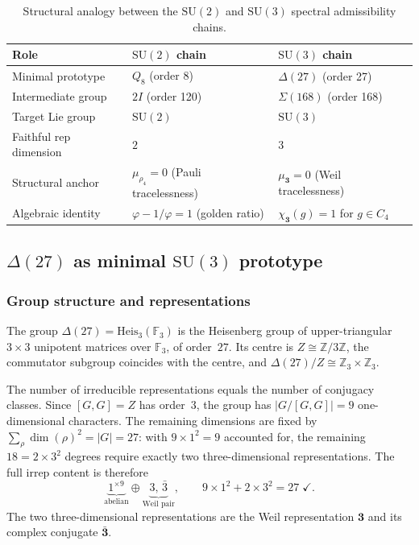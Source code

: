 \documentclass[11pt,a4paper]{article}
\begin{document}
    \begin{table}[h]
      \centering
      \renewcommand{\arraystretch}{1.3}
      \begin{tabular}{lll}
        \hline
        Role & $\mathrm{SU}(2)$ chain & $\mathrm{SU}(3)$ chain \\
        \hline
        Minimal prototype & $Q_8$ (order 8) & $\Delta(27)$ (order 27) \\
        Intermediate group & $2I$ (order 120) & $\Sigma(168)$ (order 168) \\
        Target Lie group & $\mathrm{SU}(2)$ & $\mathrm{SU}(3)$ \\
        Faithful rep dimension & $2$ & $3$ \\
        Structural anchor & $\mu_{\rho_4} = 0$ (Pauli tracelessness) & $\mu_{\mathbf{3}} = 0$
        (Weil tracelessness) \\
        Algebraic identity & $\varphi - 1/\varphi = 1$ (golden ratio) & $\chi_{\mathbf{3}}(g)
        = 1$ for $g \in C_4$ \\
        \hline
      \end{tabular}
      \caption{Structural analogy between the $\mathrm{SU}(2)$ and $\mathrm{SU}(3)$ spectral
      admissibility chains.}
      \label{tab:su2-su3-analogy}
    \end{table}

  \subsection{$\Delta(27)$ as minimal $\mathrm{SU}(3)$ prototype}
    \label{sec:delta27}

    \subsubsection{Group structure and representations}

    The group $\Delta(27) = \mathrm{Heis}_3(\mathbb{F}_3)$ is the Heisenberg group of
    upper-triangular $3 \times 3$ unipotent matrices over $\mathbb{F}_3$, of order~$27$.
    Its centre is $Z \cong \mathbb{Z}/3\mathbb{Z}$, the commutator subgroup coincides with
    the centre, and $\Delta(27)/Z \cong \mathbb{Z}_3 \times \mathbb{Z}_3$.

    The number of irreducible representations equals the number of conjugacy classes.
    Since $[G,G] = Z$ has order~$3$, the group has $|G/[G,G]| = 9$ one-dimensional
    characters.
    The remaining dimensions are fixed by $\sum_\rho \dim(\rho)^2 = |G| = 27$: with
    $9 \times 1^2 = 9$ accounted for, the remaining $18 = 2 \times 3^2$ degrees require
    exactly two three-dimensional representations.
    The full irrep content is therefore
    \begin{equation}
      \underbrace{1^{\times 9}}_{\text{abelian}} \oplus
      \underbrace{3,\,\bar{3}}_{\text{Weil pair}},
      \qquad
      9 \times 1^2 + 2 \times 3^2 = 27 \;\checkmark.
      \label{eq:delta27-irreps}
    \end{equation}
    The two three-dimensional representations are the Weil representation $\mathbf{3}$ and
    its complex conjugate $\bar{\mathbf{3}}$.
\end{document}
